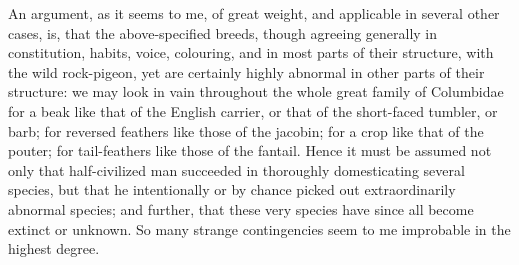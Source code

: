\indent An argument, as it seems to me, of great weight, and applicable in several other cases, is, that the above-specified breeds, though agreeing generally in constitution, habits, voice, colouring, and in most parts of their structure, with the wild rock-pigeon, yet are certainly highly abnormal in other parts of their structure: we may look in vain throughout the whole great family of Columbidae for a beak like that of the English carrier, or that of the short-faced tumbler, or barb; for reversed feathers like those of the jacobin; for a crop like that of the pouter; for tail-feathers like those of the fantail. Hence it must be assumed not only that half-civilized man succeeded in thoroughly domesticating several species, but that he intentionally or by chance picked out extraordinarily abnormal species; and further, that these very species have since all become extinct or unknown. So many strange contingencies seem to me improbable in the highest degree.  \\
